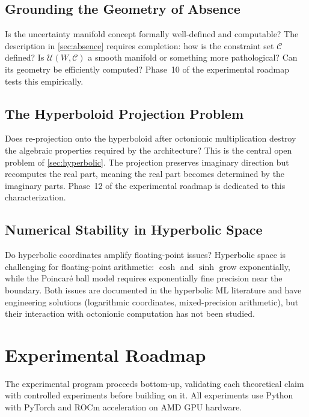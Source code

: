 \documentclass[11pt,a4paper]{article}
\begin{document}
\subsection{Grounding the Geometry of Absence}

Is the uncertainty manifold concept formally well-defined and computable? The description in \cref{sec:absence} requires completion: how is the constraint set $\mathcal{C}$ defined? Is $\mathcal{U}(W, \mathcal{C})$ a smooth manifold or something more pathological? Can its geometry be efficiently computed? Phase~10 of the experimental roadmap tests this empirically.

\subsection{The Hyperboloid Projection Problem}

Does re-projection onto the hyperboloid after octonionic multiplication destroy the algebraic properties required by the architecture? This is the central open problem of \cref{sec:hyperbolic}. The projection preserves imaginary direction but recomputes the real part, meaning the real part becomes determined by the imaginary parts. Phase~12 of the experimental roadmap is dedicated to this characterization.

\subsection{Numerical Stability in Hyperbolic Space}

Do hyperbolic coordinates amplify floating-point issues? Hyperbolic space is challenging for floating-point arithmetic: $\cosh$ and $\sinh$ grow exponentially, while the Poincar\'{e} ball model requires exponentially fine precision near the boundary. Both issues are documented in the hyperbolic ML literature and have engineering solutions (logarithmic coordinates, mixed-precision arithmetic), but their interaction with octonionic computation has not been studied.

\section{Experimental Roadmap}
\label{sec:roadmap}

The experimental program proceeds bottom-up, validating each theoretical claim with controlled experiments before building on it. All experiments use Python with PyTorch and ROCm acceleration on AMD GPU hardware.
\end{document}
